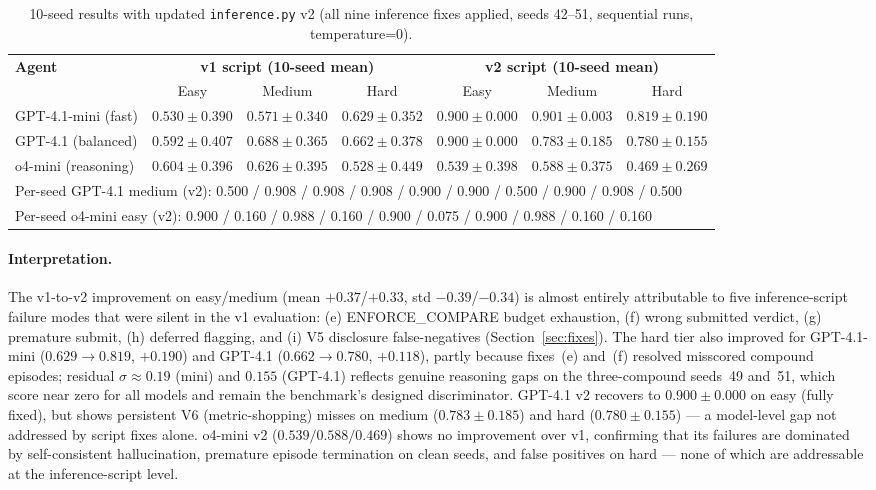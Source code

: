 \documentclass{article}
\begin{document}
\begin{table}[h]
\centering
\caption{10-seed results with updated \texttt{inference.py} v2
(all nine inference fixes applied, seeds 42--51, sequential runs, temperature=0).}
\label{tab:baseline_v2}
\small
\begin{tabular}{lcccccc}
\toprule
\multirow{2}{*}{\textbf{Agent}} &
  \multicolumn{3}{c}{\textbf{v1 script (10-seed mean)}} &
  \multicolumn{3}{c}{\textbf{v2 script (10-seed mean)}} \\
\cmidrule(lr){2-4}\cmidrule(lr){5-7}
& Easy & Medium & Hard & Easy & Medium & Hard \\
\midrule
GPT-4.1-mini (fast) &
  $0.530\pm0.390$ & $0.571\pm0.340$ & $0.629\pm0.352$ &
  $\mathbf{0.900\pm0.000}$ & $\mathbf{0.901\pm0.003}$ & $0.819\pm0.190$ \\
GPT-4.1 (balanced) &
  $0.592\pm0.407$ & $0.688\pm0.365$ & $0.662\pm0.378$ &
  $\mathbf{0.900\pm0.000}$ & $0.783\pm0.185$ & $0.780\pm0.155$ \\
o4-mini (reasoning) &
  $0.604\pm0.396$ & $0.626\pm0.395$ & $0.528\pm0.449$ &
  $0.539\pm0.398$ & $0.588\pm0.375$ & $0.469\pm0.269$ \\
\midrule
\multicolumn{7}{l}{\small Per-seed GPT-4.1 medium (v2): 0.500 / 0.908 / 0.908 / 0.908 / 0.900 / 0.900 / 0.500 / 0.900 / 0.908 / 0.500} \\
\multicolumn{7}{l}{\small Per-seed o4-mini easy (v2): 0.900 / 0.160 / 0.988 / 0.160 / 0.900 / 0.075 / 0.900 / 0.988 / 0.160 / 0.160} \\
\bottomrule
\end{tabular}
\end{table}

\paragraph{Interpretation.}
The v1-to-v2 improvement on easy/medium (mean $+0.37$/$+0.33$, std
$-0.39$/$-0.34$) is almost entirely attributable to five inference-script
failure modes that were silent in the v1 evaluation: (e) ENFORCE\_COMPARE
budget exhaustion, (f) wrong submitted verdict, (g) premature submit,
(h) deferred flagging, and (i) V5 disclosure false-negatives
(Section~\ref{sec:fixes}).  The hard tier also improved for GPT-4.1-mini
($0.629 \to 0.819$, $+0.190$) and GPT-4.1 ($0.662 \to 0.780$, $+0.118$),
partly because fixes~(e) and~(f) resolved misscored compound episodes;
residual $\sigma{\approx}0.19$ (mini) and $0.155$ (GPT-4.1) reflects
genuine reasoning gaps on the three-compound seeds~49 and~51, which score
near zero for all models and remain the benchmark's designed discriminator.
GPT-4.1 v2 recovers to $0.900\pm0.000$ on easy (fully fixed), but shows
persistent V6 (metric-shopping) misses on medium ($0.783\pm0.185$) and hard
($0.780\pm0.155$) --- a model-level gap not addressed by script fixes alone.
o4-mini v2 ($0.539 / 0.588 / 0.469$) shows no improvement over v1,
confirming that its failures are dominated by self-consistent hallucination,
premature episode termination on clean seeds, and false positives on hard ---
none of which are addressable at the inference-script level.
\end{document}
